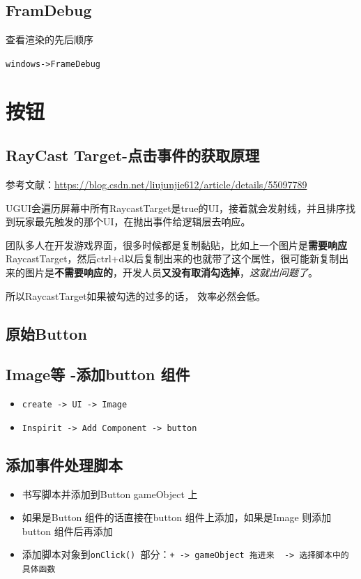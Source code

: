 \documentclass[UTF8,a4paper,12pt]{ctexbook}
\begin{document}
		\subsection{FramDebug}
			查看渲染的先后顺序
			
			\verb|windows->FrameDebug |	
	\section{按钮}
		\subsection{RayCast Target-点击事件的获取原理}
			参考文献：\url{https://blog.csdn.net/liujunjie612/article/details/55097789}
			
			UGUI会遍历屏幕中所有RaycastTarget是true的UI，接着就会发射线，并且排序找到玩家最先触发的那个UI，在抛出事件给逻辑层去响应。
			
			团队多人在开发游戏界面，很多时候都是复制黏贴，比如上一个图片是\textbf{需要响应}RaycastTarget，然后ctrl+d以后复制出来的也就带了这个属性，很可能新复制出来的图片是\textbf{不需要响应的}，开发人员\textbf{又没有取消勾选掉}，\textit{这就出问题了}。
			
			所以RaycastTarget如果被勾选的过多的话， 效率必然会低。
		\subsection{原始Button}
			
		\subsection{Image等 -添加button 组件}
			\begin{itemize}
				\item \verb|create -> UI -> Image|
				\item \verb|Inspirit -> Add Component -> button|
			\end{itemize}	
		
		\subsection{添加事件处理脚本}
			\begin{itemize}
				\item 书写脚本并添加到Button gameObject 上
				\item 如果是Button 组件的话直接在button 组件上添加，如果是Image 则添加button 组件后再添加
				\item  添加脚本对象到\verb|onClick() |部分：\verb|+ -> gameObject 拖进来  -> 选择脚本中的具体函数|
			\end{itemize}
		
\end{document}
